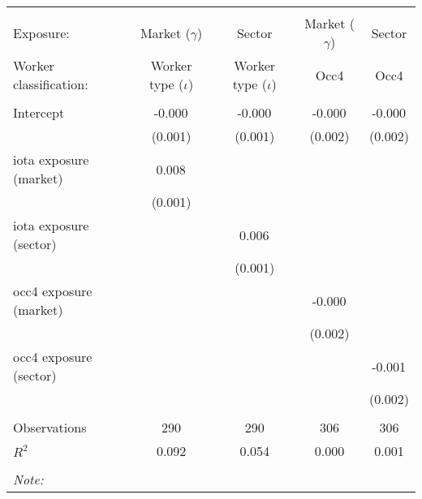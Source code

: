 \begin{tabular}{@{\extracolsep{5pt}}lcccc}
\\[-1.8ex]\hline
\hline \\[-1.8ex]
\hline \\[-1.8ex]
 Exposure: & Market ($\gamma$) & Sector & Market ($\gamma$) & Sector \\
 Worker classification: & Worker type ($\iota$) & Worker type ($\iota$) & Occ4 & Occ4 \\
 \hline &  &  &  &  \\
 Intercept & -0.000$^{}$ & -0.000$^{}$ & -0.000$^{}$ & -0.000$^{}$ \\
  & (0.001) & (0.001) & (0.002) & (0.002) \\
 iota exposure (market) & 0.008$^{}$ & & & \\
  & (0.001) & & & \\
 iota exposure (sector) & & 0.006$^{}$ & & \\
  & & (0.001) & & \\
 occ4 exposure (market) & & & -0.000$^{}$ & \\
  & & & (0.002) & \\
 occ4 exposure (sector) & & & & -0.001$^{}$ \\
  & & & & (0.002) \\
\hline \\[-1.8ex]
 Observations & 290 & 290 & 306 & 306 \\
 $R^2$ & 0.092 & 0.054 & 0.000 & 0.001 \\
\hline
\hline \\[-1.8ex]
\textit{Note:}\end{tabular}